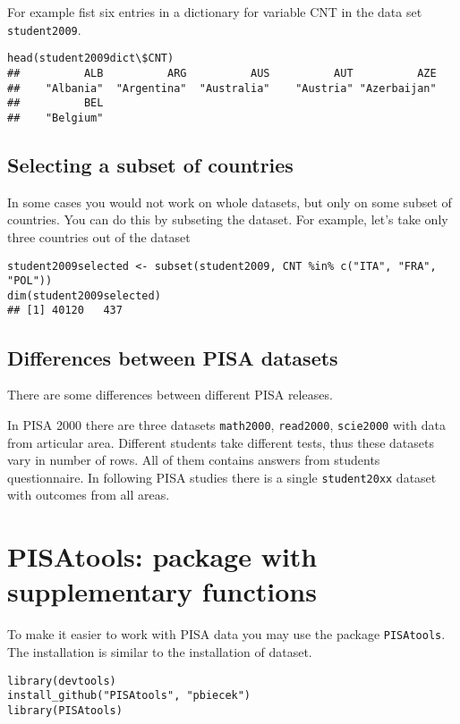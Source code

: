 For example fist six entries in a dictionary for variable CNT in the data set \verb:student2009:.
\begin{shaded}\begin{verbatim}
head(student2009dict\$CNT)
##          ALB          ARG          AUS          AUT          AZE 
##    "Albania"  "Argentina"  "Australia"    "Austria" "Azerbaijan" 
##          BEL 
##    "Belgium"
\end{verbatim}\end{shaded}

\subsection*{Selecting a subset of countries}
In some cases you would not work on whole datasets, but only on some subset of countries. You can do this by subseting the dataset. For example, let's take only three countries out of the dataset

\begin{shaded}\begin{verbatim}
student2009selected <- subset(student2009, CNT %in% c("ITA", "FRA", "POL"))
dim(student2009selected)
## [1] 40120   437
\end{verbatim}\end{shaded}

\subsection*{Differences between PISA datasets}

There are some differences between different PISA releases. 

In PISA 2000 there are three datasets \verb:math2000:, \verb:read2000:, \verb:scie2000: with data from articular area. Different students take different tests, thus these datasets vary in number of rows. 
All of them contains answers from students questionnaire. In following PISA studies there is a single \verb:student20xx: dataset with outcomes from all areas.


\section{PISAtools: package with supplementary functions}
To make it easier to work with PISA data you may use the package \verb:PISAtools:. The installation is similar to the installation of dataset.

\begin{shaded}\begin{verbatim}
library(devtools)
install_github("PISAtools", "pbiecek")
library(PISAtools)
\end{verbatim}\end{shaded}

